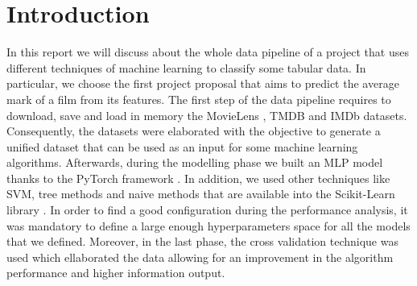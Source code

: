 \documentclass[../main]{subfiles}
\begin{document}
\chapter{Introduction}
In this report we will discuss about the whole data pipeline of a project that uses different techniques of machine learning to classify some tabular data.
In particular, we choose the first project proposal that aims to predict the average mark of a film from its features.
The first step of the data pipeline requires to download, save and load in memory the MovieLens \cite{site:movielens-datasets}, TMDB \cite{site:tmdb-api-overview} and IMDb \cite{site:imdb-datasets} datasets.  
Consequently, the datasets were elaborated with the objective to generate a unified dataset that can be used as an input for some machine learning algorithms.
Afterwards, during the modelling phase we built an MLP model thanks to the PyTorch framework \cite{NEURIPS2019_9015}.
In addition, we used other techniques like SVM, tree methods and naive methods that are available into the Scikit-Learn library \cite{scikit-learn}. 
In order to find a good configuration during the performance analysis, it was mandatory to define a large enough hyperparameters space for all the models that we defined.
Moreover, in the last phase, the cross validation technique was used which ellaborated the data allowing for an improvement in the algorithm performance and higher information output.
\end{document}
